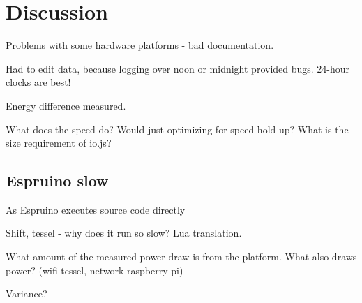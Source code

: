 \chapter{Discussion}
\label{ch:chapter5}

Problems with some hardware platforms - bad documentation.

Had to edit data, because logging over noon or midnight provided bugs. 24-hour clocks are best!

Energy difference measured.

What does the speed do? Would just optimizing for speed hold up?
What is the size requirement of io.js?

\section{Espruino slow}
As Espruino executes source code directly


Shift, tessel - why does it run so slow? Lua translation.

What amount of the measured power draw is from the platform. What also draws power? (wifi tessel, network raspberry pi)

Variance?